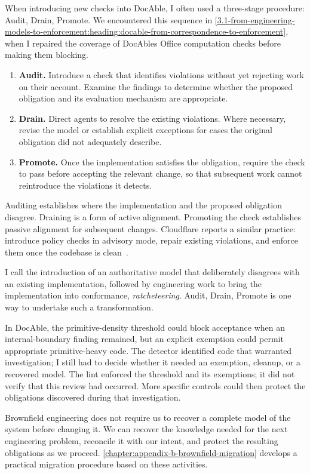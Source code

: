 When introducing new checks into DocAble, I often used a three-stage procedure: Audit, Drain, Promote. We encountered this sequence in \autoref{3.1-from-engineering-models-to-enforcement:heading:docable-from-correspondence-to-enforcement}, when I repaired the coverage of DocAble\textquotesingle s Office computation checks before making them blocking.

\begin{enumerate}
\item \textbf{Audit.} Introduce a check that identifies violations without yet rejecting work on their account. Examine the findings to determine whether the proposed obligation and its evaluation mechanism are appropriate.
\item \textbf{Drain.} Direct agents to resolve the existing violations. Where necessary, revise the model or establish explicit exceptions for cases the original obligation did not adequately describe.
\item \textbf{Promote.} Once the implementation satisfies the obligation, require the check to pass before accepting the relevant change, so that subsequent work cannot reintroduce the violations it detects.
\end{enumerate}

Auditing establishes where the implementation and the proposed obligation disagree. Draining is a form of active alignment. Promoting the check establishes passive alignment for subsequent changes. Cloudflare reports a similar practice: introduce policy checks in advisory mode, repair existing violations, and enforce them once the codebase is clean~\citep{reimann2026codex}.

I call the introduction of an authoritative model that deliberately disagrees with an existing implementation, followed by engineering work to bring the implementation into conformance, \emph{ratcheteering}. Audit, Drain, Promote is one way to undertake such a transformation.

In DocAble, the primitive-density threshold could block acceptance when an internal-boundary finding remained, but an explicit exemption could permit appropriate primitive-heavy code. The detector identified code that warranted investigation; I still had to decide whether it needed an exemption, cleanup, or a recovered model. The lint enforced the threshold and its exemptions; it did not verify that this review had occurred. More specific controls could then protect the obligations discovered during that investigation.


Brownfield engineering does not require us to recover a complete model of the system before changing it. We can recover the knowledge needed for the next engineering problem, reconcile it with our intent, and protect the resulting obligations as we proceed. \autoref{chapter:appendix-b-brownfield-migration} develops a practical migration procedure based on these activities.
